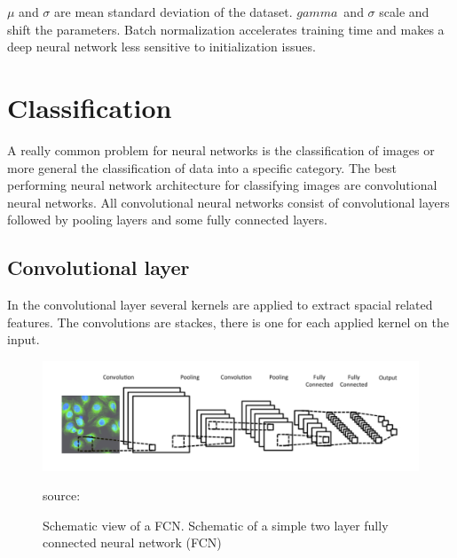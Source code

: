 \(\mu\) and \(\sigma\) are mean standard deviation of the dataset. 
\(gamma\)\ and \(\sigma\) scale and shift the parameters. Batch normalization accelerates training time and makes a deep neural network less sensitive to initialization issues.

\section{Classification}
A really common problem for neural networks is the classification of images or more general the classification of data into a specific category. The best performing neural network architecture for classifying images are convolutional neural networks. All convolutional neural networks consist of convolutional layers followed by pooling layers and some fully connected layers.

\subsection{Convolutional layer}
In the convolutional layer several kernels are applied to extract spacial related features. The convolutions are stackes, there is one for each applied kernel on the input.

\begin{figure}[H]
	\centering
	\includegraphics[width=0.8\linewidth]{bilder/grundlagen/convolution.png}
	\caption{Schematic view of a FCN. Schematic of a simple two layer fully connected neural network (FCN)} source:\cite{Component}
	\label{fig:COMPONENT}
\end{figure}



